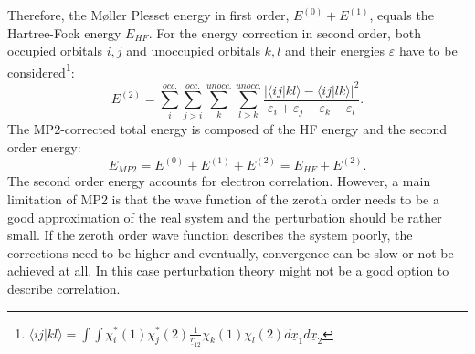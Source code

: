 \documentclass[11pt,DIV=13,BCOR=5mm,a4paper,headinclude]{scrbook}
\renewcommand{\vec}[1]{\underline{#1}}
\begin{document}
Therefore, the M\o{}ller Plesset energy in first order, $E^{(0)}+E^{(1)}$, equals the Hartree-Fock energy $E_{HF}$.
For the energy correction in second order, both occupied orbitals $i,j$ and unoccupied orbitals $k,l$ and their energies $\varepsilon$ have to be considered\footnote{$\langle ij|kl\rangle=\int\int\chi^\ast_i(1)\chi^\ast_j(2)\frac{1}{\vec{r}_{12}}\chi_k(1)\chi_l(2) d\vec{x}_1d\vec{x}_2$}:
\begin{equation}
 E^{(2)}=\sum\limits_{i}^{occ.}\sum\limits_{j>i}^{occ.}\sum\limits_{k}^{unocc.}\sum\limits_{l>k}^{unocc.} \frac{|\langle ij|kl\rangle - \langle ij|lk\rangle|^2}{\varepsilon_i + \varepsilon_j - \varepsilon_k - \varepsilon_l}.
\end{equation}
The MP2-corrected total energy is composed of the HF energy and the second order energy:
\begin{equation}
 E_{MP2} = E^{(0)}+E^{(1)} + E^{(2)} = E_{HF} + E^{(2)}.
\end{equation}
The second order energy accounts for electron correlation.
However, a main limitation of MP2 is that the wave function of the zeroth order needs to be a good approximation of the real system and the perturbation should be rather small.
If the zeroth order wave function describes the system poorly, the corrections need to be higher and eventually, convergence can be slow or not be achieved at all.
In this case perturbation theory might not be a good option to describe correlation.
\end{document}
